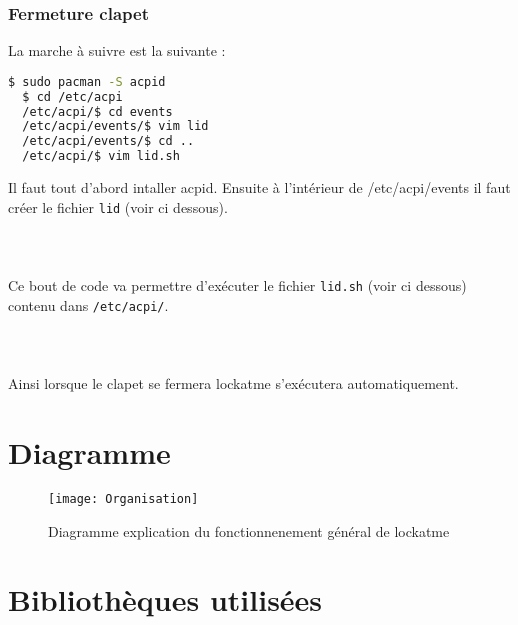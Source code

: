 \subsubsection{Fermeture clapet}
La marche à suivre est la suivante :
\begin{lstlisting}[language=bash]
  $ sudo pacman -S acpid
  $ cd /etc/acpi
  /etc/acpi/$ cd events
  /etc/acpi/events/$ vim lid
  /etc/acpi/events/$ cd ..
  /etc/acpi/$ vim lid.sh
\end{lstlisting}
Il faut tout d'abord intaller acpid. Ensuite à
l'intérieur de /etc/acpi/events il faut créer le
fichier \verb|lid| (voir ci dessous).\\
\\
\\
\\
Ce bout de code va permettre d'exécuter le fichier \verb|lid.sh| (voir ci dessous)
contenu dans \verb|/etc/acpi/|.\\
\\
\\
\\
Ainsi lorsque le clapet se fermera lockatme s'exécutera automatiquement.
\newpage

\section{Diagramme}
  \begin{figure}[h]
    \begin{center}
    \texttt{[image: Organisation]}
    \caption{Diagramme explication du fonctionnenement général de lockatme}
  \end{center}
  \end{figure}

\newpage

\section{Bibliothèques utilisées}
